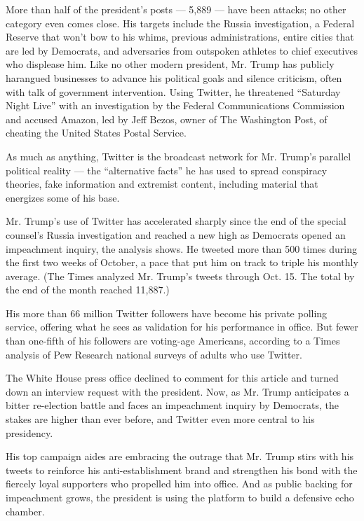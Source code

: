 More than half of the president's posts --- 5,889 --- have been attacks;
no other category even comes close. His targets include the Russia
investigation, a Federal Reserve that won't bow to his whims, previous
administrations, entire cities that are led by Democrats, and
adversaries from outspoken athletes to chief executives who displease
him. Like no other modern president, Mr. Trump has publicly harangued
businesses to advance his political goals and silence criticism, often
with talk of government intervention. Using Twitter, he threatened
``Saturday Night Live'' with an investigation by the Federal
Communications Commission and accused Amazon, led by Jeff Bezos, owner
of The Washington Post, of cheating the United States Postal Service.

As much as anything, Twitter is the broadcast network for Mr. Trump's
parallel political reality --- the ``alternative facts'' he has used to
spread conspiracy theories, fake information and extremist content,
including material that energizes some of his base.

Mr. Trump's use of Twitter has accelerated sharply since the end of the
special counsel's Russia investigation and reached a new high as
Democrats opened an impeachment inquiry, the analysis shows. He tweeted
more than 500 times during the first two weeks of October, a pace that
put him on track to triple his monthly average. (The Times analyzed Mr.
Trump's tweets through Oct. 15. The total by the end of the month
reached 11,887.)

His more than 66 million Twitter followers have become his private
polling service, offering what he sees as validation for his performance
in office. But fewer than one-fifth of his followers are voting-age
Americans, according to a Times analysis of Pew Research national
surveys of adults who use Twitter.

The White House press office declined to comment for this article and
turned down an interview request with the president. Now, as Mr. Trump
anticipates a bitter re-election battle and faces an impeachment inquiry
by Democrats, the stakes are higher than ever before, and Twitter even
more central to his presidency.

His top campaign aides are embracing the outrage that Mr. Trump stirs
with his tweets to reinforce his anti-establishment brand and strengthen
his bond with the fiercely loyal supporters who propelled him into
office. And as public backing for impeachment grows, the president is
using the platform to build a defensive echo chamber.

